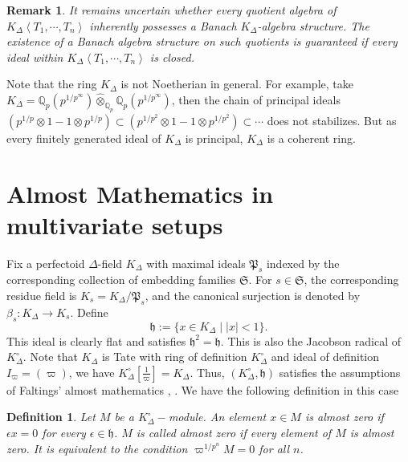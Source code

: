 \documentclass[12pts,a4paper]{amsart}
\newtheorem{remark}[proposition]{Remark}
\newtheorem{definition}[proposition]{Definition}
\begin{document}
\begin{remark}
    It remains uncertain whether every quotient algebra of $K_\Delta\left<T_1,\cdots,T_n\right>$ inherently possesses a Banach $K_\Delta$-algebra structure. The existence of a Banach algebra structure on such quotients is guaranteed if every ideal within $K_\Delta\left<T_1,\cdots,T_n\right>$ is closed.
\end{remark}

Note that the ring $K_\Delta$ is not Noetherian in general. For example, take $K_\Delta = \mathbb{Q}_p(p^{1/p^\infty})\widehat{\otimes}_{\mathbb{Q}_p}\mathbb{Q}_p(p^{1/p^\infty})$, then the chain of principal ideals $(p^{1/p}\otimes 1 - 1\otimes p^{1/p}) \subset (p^{1/p^2}\otimes 1 - 1\otimes p^{1/p^2}) \subset \cdots$ does not stabilizes. But as every finitely generated ideal of $K_\Delta$ is principal, $K_\Delta$ is a coherent ring.


\section{Almost Mathematics in multivariate setups}

Fix a perfectoid $\Delta$-field $K_\Delta$ with maximal ideals $\mathfrak{P}_s$ indexed by the corresponding collection of embedding families $\mathfrak{S}$. For $s\in\mathfrak{S}$, the corresponding residue field is $K_s = K_\Delta / \mathfrak{P}_s$, and the canonical surjection is denoted by $\beta_s: K_\Delta \to K_s$. Define
\[
    \mathfrak{h} := \{x\in K_\Delta\mid |x|<1\}.
\]
This ideal is clearly flat and satisfies $\mathfrak{h}^2 = \mathfrak{h}$. This is also the Jacobson radical of $K^\circ_\Delta$. Note that $K_\Delta$ is Tate with ring of definition $K^\circ_\Delta$ and ideal of definition $I_\varpi=(\varpi)$, we have $K^\circ_\Delta\left[\frac{1}{\varpi}\right]=K_\Delta$. Thus, $(K^\circ_\Delta, \mathfrak{h})$ satisfies the assumptions of Faltings' almost mathematics \cite{GFal}, \cite{ART}. We have the following definition in this case
\begin{definition}
    Let $M$ be a $K^\circ_\Delta-$module. An element $x\in M$ is \emph{almost zero} if $\epsilon x=0$ for every $\epsilon\in\mathfrak{h}$. $M$ is called \emph{almost zero} if every element of $M$ is almost zero. It is equivalent to the condition $\varpi^{1/p^n}M=0$ for all $n$.
\end{definition}
\end{document}
